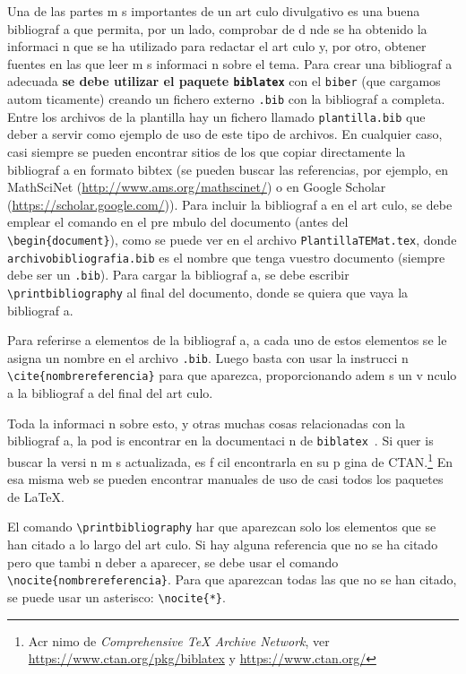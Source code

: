 \documentclass{article}
\begin{document}
Una de las partes m s importantes de un art culo divulgativo es una buena bibliograf a que permita, por un lado, comprobar de d nde se ha obtenido la informaci n que se ha utilizado para redactar el art culo y, por otro, obtener fuentes en las que leer m s informaci n sobre el tema.
Para crear una bibliograf a adecuada \textbf{se debe utilizar el paquete \texttt{biblatex}} con el  \verb+biber+ (que cargamos autom ticamente) creando un fichero externo \verb+.bib+ con la bibliograf a completa.
Entre los archivos de la plantilla hay un fichero llamado \verb+plantilla.bib+ que deber a servir como ejemplo de uso de este tipo de archivos.
En cualquier caso, casi siempre se pueden encontrar sitios de los que copiar directamente la bibliograf a en formato bibtex (se pueden buscar las referencias, por ejemplo, en MathSciNet (\url{http://www.ams.org/mathscinet/}) o en Google Scholar (\url{https://scholar.google.com/})).
Para incluir la bibliograf a en el art culo, se debe emplear el comando \verb++ en el pre mbulo del documento (antes del \verb+\begin{document}+), como se puede ver en el archivo \verb+PlantillaTEMat.tex+, donde \verb+archivobibliografia.bib+ es el nombre que tenga vuestro documento (siempre debe ser un \verb+.bib+).
Para cargar la bibliograf a, se debe escribir \verb+\printbibliography+ al final del documento, donde se quiera que vaya la bibliograf a.

Para referirse a elementos de la bibliograf a, a cada uno de estos elementos se le asigna un nombre en el archivo \verb+.bib+.
Luego basta con usar la instrucci n \verb+\cite{nombrereferencia}+ para que aparezca, proporcionando adem s un v nculo a la bibliograf a del final del art culo.

Toda la informaci n sobre esto, y otras muchas cosas relacionadas con la bibliograf a, la pod is encontrar en la documentaci n de \verb+biblatex+~\cite{biblatex}.
Si quer is buscar la versi n m s actualizada, es f cil encontrarla en su p gina de CTAN.\footnote{Acr nimo de \emph{Comprehensive \protect\TeX{} Archive Network}, ver \url{https://www.ctan.org/pkg/biblatex} y \url{https://www.ctan.org/}}
En esa misma web se pueden encontrar manuales de uso de casi todos los paquetes de \LaTeX.

\begin{nota}
El comando \verb+\printbibliography+ har  que aparezcan solo los elementos que se han citado a lo largo del art culo.
Si hay alguna referencia que no se ha citado pero que tambi n deber a aparecer, se debe usar el comando \verb+\nocite{nombrereferencia}+.
Para que aparezcan todas las que no se han citado, se puede usar un asterisco: \verb+\nocite{*}+.
\end{nota}
\end{document}
